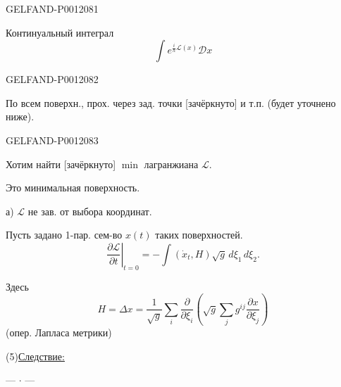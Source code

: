 \begin{GelfandAdjacentEvidence}{GELFAND-P001208}{1}

Континуальный интеграл
\begin{equation*}
\int e^{\frac{i}{h}\mathcal L(x)}\mathcal D x
\tag{3}
\end{equation*}
\end{GelfandAdjacentEvidence}
\begin{GelfandAdjacentEvidence}{GELFAND-P001208}{2}


По всем поверхн., прох. через зад. точки [зачёркнуто] и т.п. (будет уточнено ниже).
\end{GelfandAdjacentEvidence}
\begin{GelfandAdjacentEvidence}{GELFAND-P001208}{3}


Хотим найти [зачёркнуто] \(\min\) лагранжиана \(\mathcal L\).
\end{GelfandAdjacentEvidence}

Это минимальная поверхность.


а) \(\mathcal L\) не зав. от выбора координат.


Пусть задано 1-пар. сем-во \(x(t)\) таких поверхностей.
\begin{equation*}
\left.\frac{\partial\mathcal L}{\partial t}\right|_{t=0}
=-\int(\dot{x}_t,H)\sqrt g\,d\xi_1\,d\xi_2.
\tag{4}
\end{equation*}

Здесь
\[
H=\Delta x=\frac{1}{\sqrt g}\sum_i\frac{\partial}{\partial\xi_i}
\left(\sqrt g\sum_j g^{ij}\frac{\partial x}{\partial\xi_j}\right)
\]
(опер. Лапласа метрики)

(5)\quad\underline{Следствие:}


\begin{center}--- \(\cdot\) ---\end{center}

